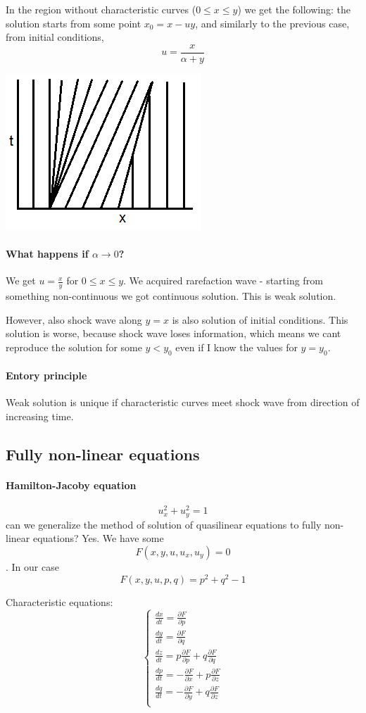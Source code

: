 In the region without characteristic curves ($0\leq x\leq y$) we get the following: the solution starts from some  point $x_0 = x-uy$, and similarly to the previous case, from initial conditions,
$$u=\frac{x}{\alpha +y}$$


\begin{center}
	\includegraphics[width=0.3\linewidth]{./lect2/p4.png}
\end{center}

\paragraph{What happens if $\alpha \to 0$?}
We get $u=\frac{x}{y}$ for $0\leq x \leq y$. We acquired rarefaction wave - starting from something non-continuous we got continuous solution. This is weak solution.

However, also shock wave along $y=x$ is also solution of initial conditions. This solution is worse, because shock wave loses information, which means we cant reproduce the solution for some $y<y_0$ even if I know the values for $y=y_0$.
\paragraph{Entory principle}
Weak solution is unique if characteristic curves meet shock wave from direction of increasing time. 


\subsection{Fully non-linear equations}
\paragraph{Hamilton-Jacoby equation}
$$u_x^2+u_y^2=1$$
can we generalize the method of solution of quasilinear equations to fully non-linear equations? Yes. 
We have some $$F(x,y,u,u_x,u_y) = 0$$. In our case $$F(x,y,u,p,q) = p^2+q^2-1$$

Characteristic equations:
$$\begin{cases}
\frac{dx}{dt} = \frac{\partial F}{\partial p}\\
\frac{dy}{dt} = \frac{\partial F}{\partial q}\\
\frac{dz}{dt} = p\frac{\partial F}{\partial p}+q\frac{\partial F}{\partial q}\\
\frac{dp}{dt} = -\frac{\partial F}{\partial x}+p\frac{\partial F}{\partial z}\\
\frac{dq}{dt} = -\frac{\partial F}{\partial y}+q\frac{\partial F}{\partial z}\\
\end{cases}$$



